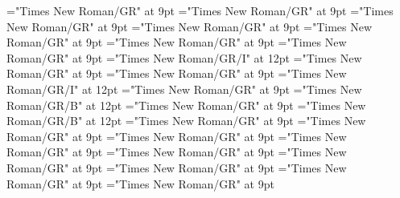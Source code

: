 \documentclass[gps1,twoside]{article}
\begin{document}
\font\spanencyclopedicinfosensesensesentryfirstchildbefore="Times New Roman/GR" at 9pt
\font\spanencyclopedicinfosensesensesentrylastchildafter="Times New Roman/GR" at 9pt
\font\spanspanrestrictionssensesensesentrybefore="Times New Roman/GR" at 9pt
\font\spanrestrictionssensesensesentryfirstchildbefore="Times New Roman/GR" at 9pt
\font\spanrestrictionssensesensesentrylastchildafter="Times New Roman/GR" at 9pt
\font\spanspanlexsensereferencessensesensesentrybefore="Times New Roman/GR" at 9pt
\font\lexsensereferencessensesensesentryafter="Times New Roman/GR" at 9pt
\font\spanenownertypeabbreviationlexsensereferencelexsensereferencessensesensesentry="Times New Roman/GR/I" at 12pt
\font\spanspanownertypeabbreviationlexsensereferencelexsensereferencessensesensesentrybefore="Times New Roman/GR" at 9pt
\font\spanownertypeabbreviationlexsensereferencelexsensereferencessensesensesentrylastchildafter="Times New Roman/GR" at 9pt
\font\spanownertypeabbreviationlexsensereferencelexsensereferencessensesensesentry="Times New Roman/GR/I" at 12pt
\font\configtargetconfigtargetconfigtargetslexsensereferencelexsensereferencessensesensesentrybefore="Times New Roman/GR" at 9pt
\font\spanbzhheadwordconfigtargetconfigtargetslexsensereferencelexsensereferencessensesensesentry="Times New Roman/GR/B" at 12pt
\font\spanspanheadwordconfigtargetconfigtargetslexsensereferencelexsensereferencessensesensesentrybefore="Times New Roman/GR" at 9pt
\font\spanheadwordconfigtargetconfigtargetslexsensereferencelexsensereferencessensesensesentry="Times New Roman/GR/B" at 12pt
\font\variantformentrybackrefvariantformentrybackrefvariantformentrybackrefssensesensesentrybefore="Times New Roman/GR" at 9pt
\font\variantformentrybackrefssensesensesentrybefore="Times New Roman/GR" at 9pt
\font\variantformentrybackrefssensesensesentryafter="Times New Roman/GR" at 9pt
\font\variantentrytypevariantentrytypevariantentrytypesvariantformentrybackrefvariantformentrybackrefssensesensesentrybefore="Times New Roman/GR" at 9pt
\font\variantentrytypesvariantformentrybackrefvariantformentrybackrefssensesensesentryafter="Times New Roman/GR" at 9pt
\font\spanspanreverseabbrvariantentrytypevariantentrytypesvariantformentrybackrefvariantformentrybackrefssensesensesentrybefore="Times New Roman/GR" at 9pt
\font\spanreverseabbrvariantentrytypevariantentrytypesvariantformentrybackrefvariantformentrybackrefssensesensesentrylastchildafter="Times New Roman/GR" at 9pt
\font\spanspanheadwordvariantformentrybackrefvariantformentrybackrefssensesensesentrybefore="Times New Roman/GR" at 9pt
\font\spanspanowningentrysummarydefinitionvariantformentrybackrefvariantformentrybackrefssensesensesentrybefore="Times New Roman/GR" at 9pt
\end{document}
